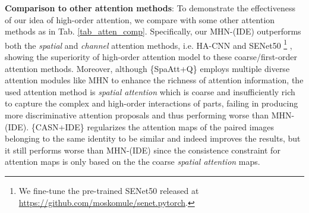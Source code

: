 \documentclass[10pt,twocolumn,letterpaper]{article}
\begin{document}
\begin{table}[t!]
  \centering
      \caption{Comparison to other attention methods (\%).  indicates our reproducing.}
      \vspace{-1.5em}
  \label{tab_atten_comp}\end{table}\textbf{Comparison to other attention methods}: To demonstrate the effectiveness of our idea of high-order attention, we compare with some other attention methods as in Tab. \ref{tab_atten_comp}. Specifically, our MHN-(IDE) outperforms both the \emph{spatial} and \emph{channel} attention methods, i.e. HA-CNN \cite{li2018harmonious} and SENet50 \footnote{We fine-tune the pre-trained SENet50 released at \url{https://github.com/moskomule/senet.pytorch}.} \cite{hu2018squeeze}, showing the superiority of high-order attention model to these coarse/first-order attention methods. Moreover, although \{SpaAtt+Q\} \cite{li2018diversity} employs multiple diverse attention modules like MHN to enhance the richness of attention information, the used attention method is \emph{spatial attention} which is coarse and insufficiently rich to capture the complex and high-order interactions of parts, failing in producing more discriminative attention proposals and thus performing worse than MHN-(IDE). \{CASN+IDE\} \cite{zheng2018re} regularizes the attention maps of the paired images belonging to the same identity to be similar and indeed improves the results, but it still performs worse than MHN-(IDE) since the consistence constraint for attention maps is only based on the the coarse \emph{spatial attention} maps.
\end{document}
